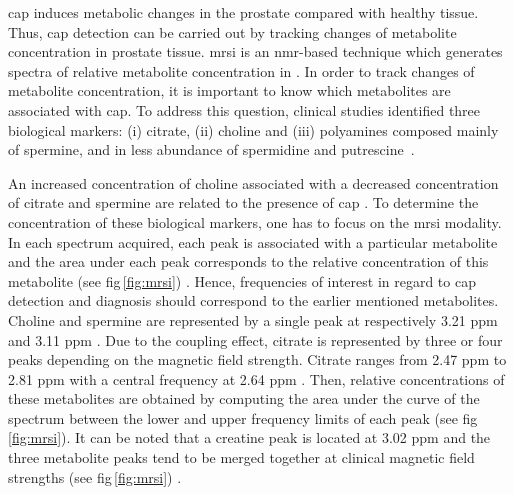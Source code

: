 \ac{cap} induces metabolic changes in the prostate compared with healthy tissue. Thus, \ac{cap} detection can be carried out by tracking changes of metabolite concentration in prostate tissue. \ac{mrsi} is an \ac{nmr}-based technique which generates spectra of relative metabolite concentration in . In order to track changes of metabolite concentration, it is important to know which metabolites are associated with \ac{cap}. To address this question, clinical studies identified three biological markers: (i) citrate, (ii) choline and (iii) polyamines composed mainly of spermine, and in less abundance of spermidine and putrescine~\cite{Awwad2012,Costello2006,Giskeodegard2013}. 

An increased concentration of choline associated with a decreased concentration of citrate and spermine are related to the presence of \ac{cap} \cite{Awwad2012,Costello2006,Graaf2000,Giskeodegard2013}. To determine the concentration of these biological markers, one has to focus on the \ac{mrsi} modality. In each spectrum acquired, each peak is associated with a particular metabolite and the area under each peak corresponds to the relative concentration of this metabolite (see \acs{fig}\,\ref{fig:mrsi}) \cite{Parfait2010}. Hence, frequencies of interest in regard to \ac{cap} detection and diagnosis should correspond to the earlier mentioned metabolites. Choline and spermine are represented by a single peak at respectively 3.21 ppm and 3.11 ppm \cite{Verma2010}. Due to the coupling effect, citrate is represented by three or four peaks depending on the magnetic field strength. Citrate ranges from 2.47 ppm to 2.81 ppm with a central frequency at 2.64 ppm \cite{Verma2010}. Then, relative concentrations of these metabolites are obtained by computing the area under the curve of the spectrum between the lower and upper frequency limits of each peak (see \acs{fig}\,\ref{fig:mrsi}). It can be noted that a creatine peak is located at 3.02 ppm and the three metabolite peaks tend to be merged together at clinical magnetic field strengths (see \acs{fig}\,\ref{fig:mrsi}) \cite{Hoeks2011,Graaf2000}.


